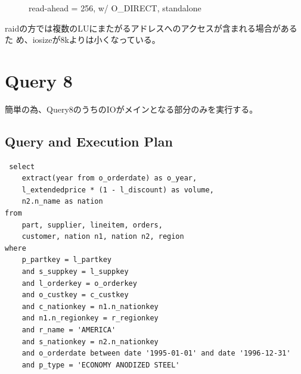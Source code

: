 \documentclass[11pt,a4paper]{jsarticle}
\newlength{\subfigwidth}
\newlength{\subfigcolsep}
\begin{document}
\begin{figure}[thbp]
 \setlength{\subfigwidth}{.5\linewidth}
 \addtolength{\subfigwidth}{-.5\subfigcolsep}
 \begin{minipage}[b]{\subfigwidth}
 \end{minipage}
  \begin{minipage}[b]{\subfigwidth}
  \end{minipage}
  \caption{read-ahead = 256, w/ O\_DIRECT, standalone}
  \label{fig:fioarand8k256wod}
\end{figure}

raidの方では複数のLUにまたがるアドレスへのアクセスが含まれる場合があるた
め、iosizeが8kよりは小くなっている。

\clearpage
\section{Query 8}
簡単の為、Query8のうちのIOがメインとなる部分のみを実行する。

\subsection{Query and Execution Plan}
\begin{verbatim}
 select
	extract(year from o_orderdate) as o_year,
	l_extendedprice * (1 - l_discount) as volume,
	n2.n_name as nation
from
	part, supplier, lineitem, orders,
	customer, nation n1, nation n2,	region
where
	p_partkey = l_partkey
	and s_suppkey = l_suppkey
	and l_orderkey = o_orderkey
	and o_custkey = c_custkey
	and c_nationkey = n1.n_nationkey
	and n1.n_regionkey = r_regionkey
	and r_name = 'AMERICA'
	and s_nationkey = n2.n_nationkey
	and o_orderdate between date '1995-01-01' and date '1996-12-31'
	and p_type = 'ECONOMY ANODIZED STEEL'
\end{verbatim}
\end{document}
